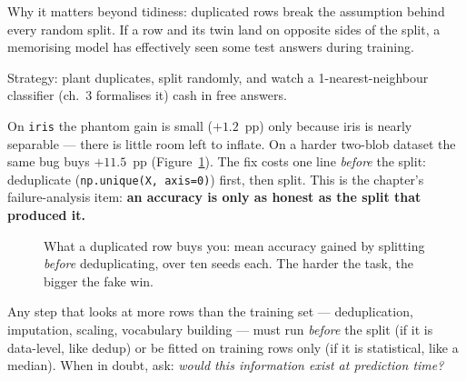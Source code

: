 Why it matters beyond tidiness: duplicated rows break the assumption behind
every random split. If a row and its twin land on opposite sides of the
split, a memorising model has effectively seen some test answers during
training.





\begin{example}\label{ex:leak}
Strategy: plant duplicates, split randomly, and watch a 1-nearest-neighbour
classifier (ch.~3 formalises it) cash in free answers.\par
\begin{solution}
On \texttt{iris} the phantom gain is small ($+1.2$~pp) only because iris is
nearly separable --- there is little room left to inflate. On a harder
two-blob dataset the same bug buys $+11.5$~pp (Figure~\ref{fig:leak-bars}).
The fix costs one line \emph{before} the split: deduplicate
(\texttt{np.unique(X, axis=0)}) first, then split. This is the chapter's
failure-analysis item: \textbf{an accuracy is only as honest as the split
that produced it.}
\end{solution}
\end{example}

\begin{figure}[ht]\centering
{}
\caption{What a duplicated row buys you: mean accuracy gained by splitting
\emph{before} deduplicating, over ten seeds each. The harder the task, the
bigger the fake win.}\label{fig:leak-bars}
\end{figure}

\begin{tripwire}
Any step that looks at more rows than the training set --- deduplication,
imputation, scaling, vocabulary building --- must run \emph{before} the split
(if it is data-level, like dedup) or be fitted on training rows only (if it is
statistical, like a median). When in doubt, ask: \emph{would this information
exist at prediction time?}
\end{tripwire}

